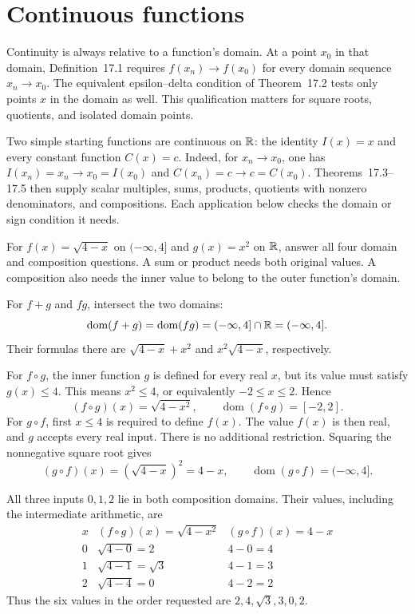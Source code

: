 \section{Continuous functions}
\label{sec:continuous-functions}
Continuity is always relative to a function's domain. At a point
$x_0$ in that domain, Definition~17.1 requires
$f(x_n)\to f(x_0)$ for every domain sequence $x_n\to x_0$.
The equivalent epsilon--delta condition of Theorem~17.2 tests only
points $x$ in the domain as well. This qualification matters for
square roots, quotients, and isolated domain points.

Two simple starting functions are continuous on $\mathbb{R}$: the identity
$I(x)=x$ and every constant function $C(x)=c$. Indeed, for
$x_n\to x_0$, one has $I(x_n)=x_n\to x_0=I(x_0)$ and
$C(x_n)=c\to c=C(x_0)$. Theorems~17.3--17.5 then supply
scalar multiples, sums, products, quotients with nonzero
denominators, and compositions. Each application below checks
the domain or sign condition it needs.

\goal For $f(x)=\sqrt{4-x}$ on $(-\infty,4]$ and
$g(x)=x^2$ on $\mathbb{R}$, answer all four domain and composition questions.
\idea A sum or product needs both original values. A composition
also needs the inner value to belong to the outer function's domain.

For $f+g$ and $fg$, intersect the two domains:
\[
 \operatorname{dom}(f+g)=\operatorname{dom}(fg)
 =(-\infty,4]\cap\mathbb{R}=(-\infty,4].
\]
Their formulas there are $\sqrt{4-x}+x^2$ and
$x^2\sqrt{4-x}$, respectively.

For $f\circ g$, the inner function $g$ is defined for every real
$x$, but its value must satisfy $g(x)\le4$. This means
$x^2\le4$, or equivalently $-2\le x\le2$. Hence
\[
 (f\circ g)(x)=\sqrt{4-x^2},\qquad
 \operatorname{dom}(f\circ g)=[-2,2].
\]
For $g\circ f$, first $x\le4$ is required to define $f(x)$.
The value $f(x)$ is then real, and $g$ accepts every real input.
There is no additional restriction. Squaring the nonnegative
square root gives
\[
 (g\circ f)(x)=(\sqrt{4-x})^2=4-x,\qquad
 \operatorname{dom}(g\circ f)=(-\infty,4].
\]

All three inputs $0,1,2$ lie in both composition domains. Their
values, including the intermediate arithmetic, are
\[
 \begin{array}{c|c|c}
 x&(f\circ g)(x)=\sqrt{4-x^2}&(g\circ f)(x)=4-x\\ \hline
 0&\sqrt{4-0}=2&4-0=4\\
 1&\sqrt{4-1}=\sqrt3&4-1=3\\
 2&\sqrt{4-4}=0&4-2=2
 \end{array}
\]
Thus the six values in the order requested are
$2,4,\sqrt3,3,0,2$.

